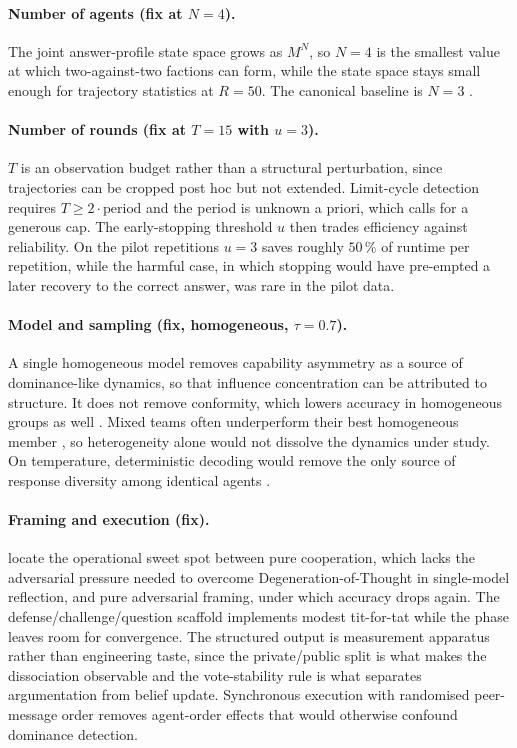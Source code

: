 \paragraph{Number of agents (fix at $N = 4$).}
The joint answer-profile state space grows as $M^N$, so $N = 4$ is the smallest
value at which two-against-two factions can form, while the state space stays small enough for
trajectory statistics at $R = 50$. The canonical baseline is $N = 3$
\citep{du2024improving}.

\paragraph{Number of rounds (fix at $T = 15$ with $u = 3$).}
$T$ is an observation budget rather than a structural perturbation, since
trajectories can be cropped post hoc but not extended. Limit-cycle
detection requires $T \geq 2 \cdot \text{period}$ and the period is unknown a
priori, which calls for a generous cap. The early-stopping
threshold $u$ then trades efficiency against reliability. On the pilot repetitions
$u = 3$ saves roughly $50\,\%$ of runtime per repetition, while the harmful case,
in which stopping would have pre-empted a later recovery to the correct answer,
was rare in the pilot data.

\paragraph{Model and sampling (fix, homogeneous, $\tau = 0.7$).}
A single homogeneous model removes capability asymmetry as a source of
dominance-like dynamics, so that influence concentration can be attributed to
structure. It does not remove conformity, which lowers accuracy in homogeneous
groups as well \citep{wynn2025talk}. Mixed
teams often underperform their best homogeneous member
\citep{bertalanic2026costofconsensus}, so heterogeneity alone would not dissolve
the dynamics under study. On temperature, deterministic decoding would remove the only
source of response diversity among identical agents \citep{zhu2026demystifying}.

\paragraph{Framing and execution (fix).}
\citet{liang2024encouraging} locate the operational sweet spot between pure
cooperation, which lacks the adversarial pressure needed to overcome
De\-gen\-er\-a\-tion-of-Thought in single-model reflection, and pure adversarial
framing, under which accuracy drops again. The defense\slash challenge\slash question scaffold
implements modest tit-for-tat while the \updatephase{} phase leaves room for
convergence. The structured output is measurement apparatus rather than
engineering taste, since the private\slash public split is what makes the dissociation
observable and the vote-stability rule is what separates argumentation from belief
update. Synchronous execution with randomised peer-message order removes
agent-order effects that would otherwise confound dominance detection.

